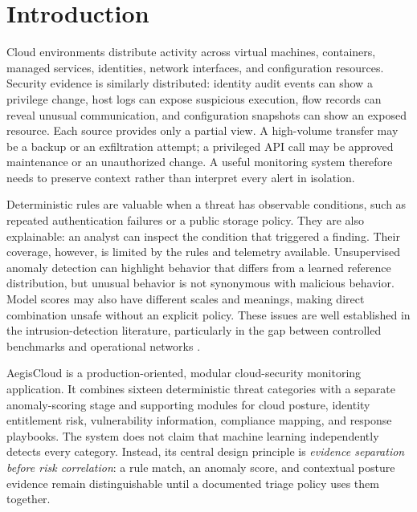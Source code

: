 \documentclass[conference]{IEEEtran}
\begin{document}
\section{Introduction}
Cloud environments distribute activity across virtual machines, containers, managed services, identities, network interfaces, and configuration resources. Security evidence is similarly distributed: identity audit events can show a privilege change, host logs can expose suspicious execution, flow records can reveal unusual communication, and configuration snapshots can show an exposed resource. Each source provides only a partial view. A high-volume transfer may be a backup or an exfiltration attempt; a privileged API call may be approved maintenance or an unauthorized change. A useful monitoring system therefore needs to preserve context rather than interpret every alert in isolation.

Deterministic rules are valuable when a threat has observable conditions, such as repeated authentication failures or a public storage policy. They are also explainable: an analyst can inspect the condition that triggered a finding. Their coverage, however, is limited by the rules and telemetry available. Unsupervised anomaly detection can highlight behavior that differs from a learned reference distribution, but unusual behavior is not synonymous with malicious behavior. Model scores may also have different scales and meanings, making direct combination unsafe without an explicit policy. These issues are well established in the intrusion-detection literature, particularly in the gap between controlled benchmarks and operational networks \cite{sommer2010outside,garcia2009anomaly,ring2019survey}.

AegisCloud is a production-oriented, modular cloud-security monitoring application. It combines sixteen deterministic threat categories with a separate anomaly-scoring stage and supporting modules for cloud posture, identity entitlement risk, vulnerability information, compliance mapping, and response playbooks. The system does not claim that machine learning independently detects every category. Instead, its central design principle is \emph{evidence separation before risk correlation}: a rule match, an anomaly score, and contextual posture evidence remain distinguishable until a documented triage policy uses them together.
\end{document}
